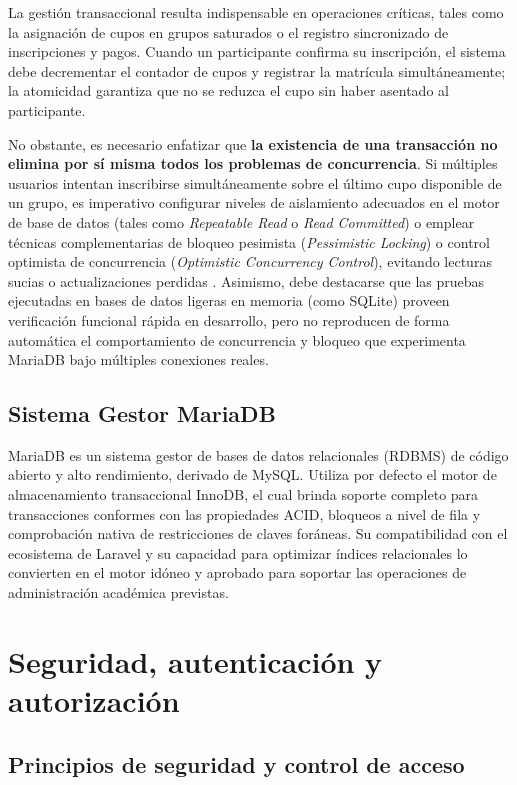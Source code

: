 La gestión transaccional resulta indispensable en operaciones críticas, tales como la asignación de cupos en grupos saturados o el registro sincronizado de inscripciones y pagos. Cuando un participante confirma su inscripción, el sistema debe decrementar el contador de cupos y registrar la matrícula simultáneamente; la atomicidad garantiza que no se reduzca el cupo sin haber asentado al participante.

No obstante, es necesario enfatizar que \textbf{la existencia de una transacción no elimina por sí misma todos los problemas de concurrencia}. Si múltiples usuarios intentan inscribirse simultáneamente sobre el último cupo disponible de un grupo, es imperativo configurar niveles de aislamiento adecuados en el motor de base de datos (tales como \textit{Repeatable Read} o \textit{Read Committed}) o emplear técnicas complementarias de bloqueo pesimista (\textit{Pessimistic Locking}) o control optimista de concurrencia (\textit{Optimistic Concurrency Control}), evitando lecturas sucias o actualizaciones perdidas \cite{mariadb2024transactions}. Asimismo, debe destacarse que las pruebas ejecutadas en bases de datos ligeras en memoria (como SQLite) proveen verificación funcional rápida en desarrollo, pero no reproducen de forma automática el comportamiento de concurrencia y bloqueo que experimenta MariaDB bajo múltiples conexiones reales.

\subsection{Sistema Gestor MariaDB}

MariaDB es un sistema gestor de bases de datos relacionales (RDBMS) de código abierto y alto rendimiento, derivado de MySQL. Utiliza por defecto el motor de almacenamiento transaccional InnoDB, el cual brinda soporte completo para transacciones conformes con las propiedades ACID, bloqueos a nivel de fila y comprobación nativa de restricciones de claves foráneas. Su compatibilidad con el ecosistema de Laravel y su capacidad para optimizar índices relacionales lo convierten en el motor idóneo y aprobado para soportar las operaciones de administración académica previstas.

\section{Seguridad, autenticación y autorización}

\subsection{Principios de seguridad y control de acceso}

